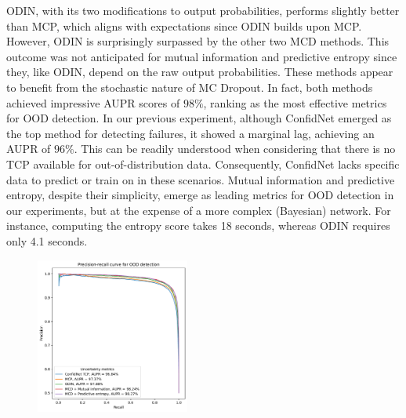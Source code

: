 ODIN, with its two modifications to output probabilities, performs slightly better than MCP, which aligns with expectations since ODIN builds upon MCP. However, ODIN is surprisingly surpassed by the other two MCD methods. This outcome was not anticipated for mutual information and predictive entropy since they, like ODIN, depend on the raw output probabilities. These methods appear to benefit from the stochastic nature of MC Dropout. In fact, both methods achieved impressive AUPR scores of $98\%$, ranking as the most effective metrics for OOD detection. In our previous experiment, although ConfidNet emerged as the top method for detecting failures, it showed a marginal lag, achieving an AUPR of $96\%$. This can be readily understood when considering that there is no TCP available for out-of-distribution data. Consequently, ConfidNet lacks specific data to predict or train on in these scenarios. Mutual information and predictive entropy, despite their simplicity, emerge as leading metrics for OOD detection in our experiments, but at the expense of a more complex (Bayesian) network. For instance, computing the entropy score takes 18 seconds, whereas ODIN requires only 4.1 seconds.
\begin{figure}[H]
    \centering
    \includegraphics[width=0.45\textwidth]{OOD_aupr.pdf}
    \caption{}
    \label{fig:OOD_aupr}
\end{figure}


